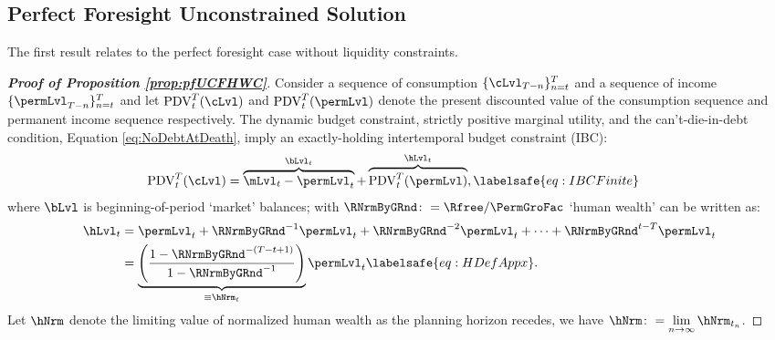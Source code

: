 \documentclass[\econtexRoot/BufferStockTheory]{subfiles}
\begin{document}
\subsection{Perfect Foresight Unconstrained Solution}\label{subsec:ApndxUCPF}

The first result relates to the perfect foresight case without liquidity constraints.


\begin{proof}[\textbf{Proof of Proposition \ref{prop:pfUCFHWC}}]
Consider a sequence of consumption $\{\cLvl_{T-n}\}_{n= t}^{T}$ and a sequence of income $\{\permLvl_{T-n}\}_{n= t}^{T}$  and let $\mathrm{PDV}_{t}^{T}(\cLvl)$  and $\mathrm{PDV}_{t}^{T}(\permLvl)$ denote the present discounted value of the consumption sequence and permanent income sequence respectively.
The dynamic budget constraint, strictly positive marginal utility, and the can't-die-in-debt condition, Equation \eqref{eq:NoDebtAtDeath}, imply an exactly-holding intertemporal budget constraint (IBC):
%
%
\begin{equation}\begin{gathered}\begin{aligned}
  \mathrm{PDV}_{t}^{T}(\cLvl)  & = \overbrace{\mLvl_{t}-\permLvl_{t}}^{\bLvl_{t}}+\overbrace{\mathrm{PDV}_{t}^{T}(\permLvl)}^{\hLvl_{t}}, \labelsafe{eq:IBCFinite}
\end{aligned}\end{gathered}\end{equation} \hypertarget{FHWFacDefn}{}\hypertarget{PFRNrmByGRndDefn}{}
where $\bLvl$ is beginning-of-period `market' balances; with $\RNrmByGRnd \colon = \Rfree/\PermGroFac$ `human wealth' can be written as:
%
% 
\begin{equation}\begin{gathered}\begin{aligned}
  \hLvl_{t}  & = \permLvl_{t}+\RNrmByGRnd^{-1} \permLvl_{t} + \RNrmByGRnd^{-2} \permLvl_{t} + \cdots + \RNrmByGRnd^{t-T} \permLvl_{t} \notag
  \\  & = \underbrace{\left(\frac{1-\RNrmByGRnd^{-(T-t+1)}}{1-\RNrmByGRnd^{-1}}\right)}_{\equiv \hNrm_{t}}\permLvl_{t} \labelsafe{eq:HDefAppx}.
\end{aligned}\end{gathered}\end{equation}
%
%
Let $\hNrm$ denote the limiting value of normalized human wealth as the planning horizon recedes, we have  $\hNrm \colon = \lim\limits_{n \rightarrow \infty} \hNrm_{t_{n}}$.



\end{proof}
\end{document}
